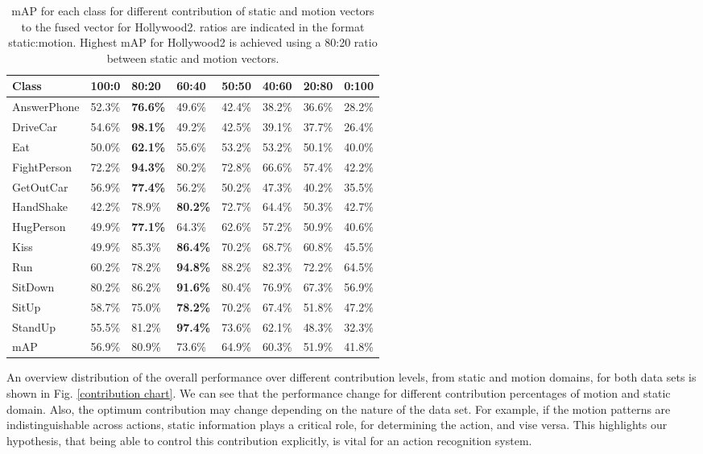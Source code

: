 \begin{table*}[]
\centering
\caption{mAP for each class for different contribution of static and motion vectors to the fused vector for Hollywood2. ratios are indicated in the
format static:motion. Highest mAP for Hollywood2 is achieved using a
80:20 ratio between static and motion vectors.}\label{tbl:rho hollywood2}
\begin{tabular}{|l||l|l|l|l|l|l|l|}
\hline
Class           & 100:0 & 80:20 & 60:40 & 50:50 & 40:60 & 20:80 & 0:100 \\ \hline \hline
AnswerPhone     & 52.3\%& \textbf{76.6\%}& 49.6\%& 42.4\%& 38.2\%& 36.6\%& 28.2\%        \\
DriveCar        & 54.6\%& \textbf{98.1\%}& 49.2\%& 42.5\%& 39.1\%& 37.7\%& 26.4\%            \\
Eat             & 50.0\%& \textbf{62.1\%}& 55.6\%& 53.2\%& 53.2\%& 50.1\%& 40.0\%           \\
FightPerson     & 72.2\%& \textbf{94.3\%}& 80.2\%& 72.8\%& 66.6\%& 57.4\%& 42.2\%  \\
GetOutCar       & 56.9\%& \textbf{77.4\%}& 56.2\%& 50.2\%& 47.3\%& 40.2\%& 35.5\%\\
HandShake       & 42.2\%& 78.9\%& \textbf{80.2\%}& 72.7\%& 64.4\%& 50.3\%& 42.7\% \\
HugPerson       & 49.9\%& \textbf{77.1\%}& 64.3\%& 62.6\%& 57.2\%& 50.9\%& 40.6\% \\
Kiss            & 49.9\%& 85.3\%& \textbf{86.4\%}& 70.2\%& 68.7\%& 60.8\%& 45.5\% \\
Run             & 60.2\%& 78.2\%& \textbf{94.8\%}& 88.2\%& 82.3\%& 72.2\%& 64.5\%  \\
SitDown         & 80.2\%& 86.2\%& \textbf{91.6\%}& 80.4\%& 76.9\%& 67.3\%& 56.9\%  \\
SitUp           & 58.7\%& 75.0\%& \textbf{78.2\%}& 70.2\%& 67.4\%& 51.8\%& 47.2\% \\
StandUp         & 55.5\%& 81.2\%& \textbf{97.4\%}& 73.6\%& 62.1\%& 48.3\%& 32.3\% \\ \hline
mAP             &  56.9\% & 80.9\%   &  73.6\%    &    64.9\%   &    60.3\%   &   51.9\%    &  41.8\%\\ \hline

\end{tabular}
\end{table*}

An overview distribution of the overall performance over different contribution levels, from static and motion domains, for both data sets is shown in Fig. \ref{contribution chart}.
We can see that the performance change for different contribution percentages of motion and static domain. Also, the optimum contribution may change
depending on the nature of the data set. For example, if the motion patterns are indistinguishable across actions, static information plays
a critical role, for determining the action, and vise versa. This highlights
our hypothesis, that being able to control this contribution explicitly, is vital for an action recognition system.


